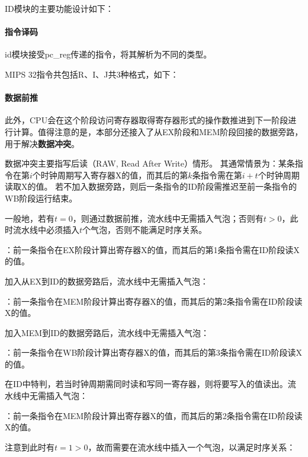     ID模块的主要功能设计如下：

        \paragraph{指令译码}
        id模块接受pc\_reg传递的指令，将其解析为不同的类型。

        MIPS 32指令共包括R、I、J共3种格式，如下：

        \paragraph{数据前推}
        此外，CPU会在这个阶段访问寄存器取得寄存器形式的操作数推进到下一阶段进行计算。值得注意的是，本部分还接入了从EX阶段和MEM阶段回接的数据旁路，用于解决\textbf{数据冲突}。

        数据冲突主要指写后读（RAW, Read After Write）情形。
        其通常情景为：某条指令在第$i$个时钟周期写入寄存器X的值，而其后的第$k$条指令需在第$i+t$个时钟周期读取X的值。
        若不加入数据旁路，则后一条指令的ID阶段需推迟至前一条指令的WB阶段运行结束。

        一般地，若有$t = 0$，则通过数据前推，流水线中无需插入气泡；否则有$t > 0$，此时流水线中必须插入$t$个气泡，否则不能满足时序关系。

        \begin{enumerate}
            ：前一条指令在EX阶段计算出寄存器X的值，而其后的第1条指令需在ID阶段读X的值。

            加入从EX到ID的数据旁路后，流水线中无需插入气泡：

            ：前一条指令在MEM阶段计算出寄存器X的值，而其后的第2条指令需在ID阶段读X的值。

            加入MEM到ID的数据旁路后，流水线中无需插入气泡：

            ：前一条指令在WB阶段计算出寄存器X的值，而其后的第3条指令需在ID阶段读X的值。

            在ID中特判，若当时钟周期需同时读和写同一寄存器，则将要写入的值读出。流水线中无需插入气泡：

            ：前一条指令在MEM阶段计算出寄存器X的值，而其后的第2条指令需在ID阶段读X的值。

            注意到此时有$t = 1 > 0$，故而需要在流水线中插入一个气泡，以满足时序关系：
        \end{enumerate}

